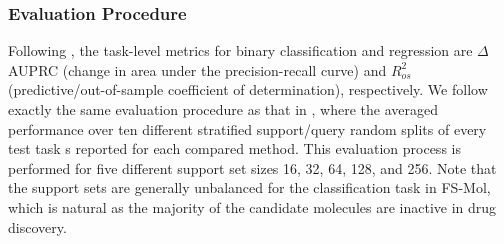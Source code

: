         \subsubsection{Evaluation Procedure}
        Following \citet{stanley2021fsmol},
        the task-level metrics for binary classification and regression are $\Delta$AUPRC
        (change in area under the
        precision-recall curve) and $R^2_{os}$ (predictive/out-of-sample coefficient of determination),
        respectively.
        We follow exactly the same evaluation procedure as that in \citet{stanley2021fsmol},
        where the averaged performance over ten different stratified support/query random splits of every test task 
        s reported for each compared method. This evaluation process is performed for five different
        support set sizes 16, 32, 64, 128, and 256. Note that the support sets are generally
        unbalanced for the classification task in FS-Mol, which is natural as the majority of the
        candidate molecules are inactive in drug discovery.

        
